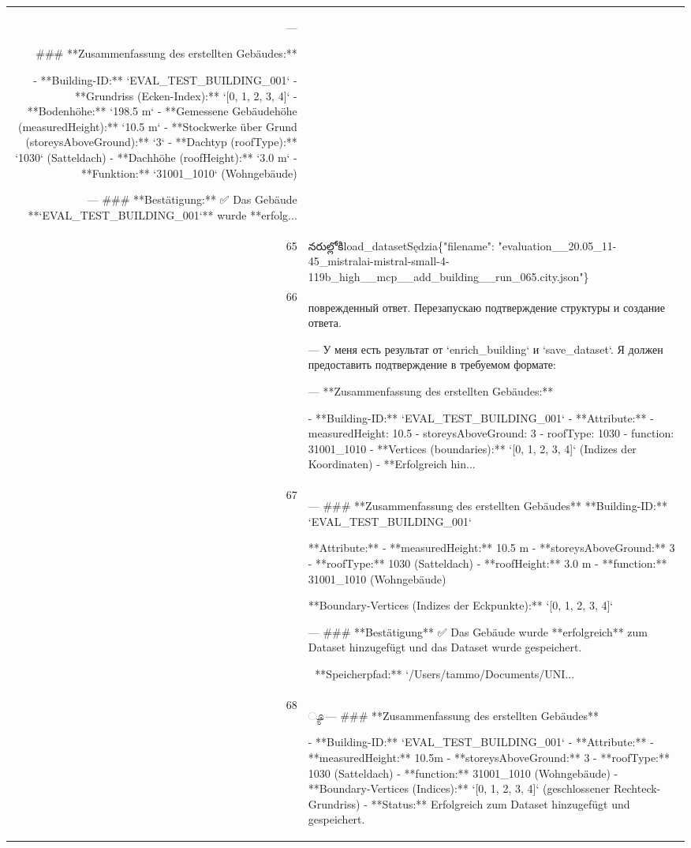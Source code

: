\documentclass[a4paper,11pt]{article}
\begin{document}
\begin{table}[ht]
\begin{tabular}{r p{12cm}}
---

\#\#\# **Zusammenfassung des erstellten Gebäudes:**

- **Building-ID:** `EVAL\_TEST\_BUILDING\_001`
- **Grundriss (Ecken-Index):** `[0, 1, 2, 3, 4]`
- **Bodenhöhe:** `198.5 m`
- **Gemessene Gebäudehöhe (measuredHeight):** `10.5 m`
- **Stockwerke über Grund (storeysAboveGround):** `3`
- **Dachtyp (roofType):** `1030` (Satteldach)
- **Dachhöhe (roofHeight):** `3.0 m`
- **Funktion:** `31001\_1010` (Wohngebäude)

---
\#\#\# **Bestätigung:**
✅ Das Gebäude **`EVAL\_TEST\_BUILDING\_001`** wurde **erfolg... \\
65 & నరుల్లోకిload\_datasetSędzia\{"filename": "evaluation\_\_20.05\_11-45\_mistralai-mistral-small-4-119b\_high\_\_mcp\_\_add\_building\_\_run\_065.city.json"\} \\
66 &  поврежденный ответ. Перезапускаю подтверждение структуры и создание ответа. 

---
У меня есть результат от `enrich\_building` и `save\_dataset`.
Я должен предоставить подтверждение в требуемом формате:

---
**Zusammenfassung des erstellten Gebäudes:**

- **Building-ID:** `EVAL\_TEST\_BUILDING\_001`
- **Attribute:**
  - measuredHeight: 10.5
  - storeysAboveGround: 3
  - roofType: 1030
  - function: 31001\_1010
- **Vertices (boundaries):** `[0, 1, 2, 3, 4]` (Indizes der Koordinaten)
- **Erfolgreich hin... \\
67 & ---
\#\#\# **Zusammenfassung des erstellten Gebäudes**
**Building-ID:** `EVAL\_TEST\_BUILDING\_001`

**Attribute:**
- **measuredHeight:** 10.5 m
- **storeysAboveGround:** 3
- **roofType:** 1030 (Satteldach)
- **roofHeight:** 3.0 m
- **function:** 31001\_1010 (Wohngebäude)

**Boundary-Vertices (Indizes der Eckpunkte):**
`[0, 1, 2, 3, 4]`

---
\#\#\# **Bestätigung**
✅ Das Gebäude wurde **erfolgreich** zum Dataset hinzugefügt und das Dataset wurde gespeichert.

📁 **Speicherpfad:** `/Users/tammo/Documents/UNI... \\
68 & ್ಯೂ---
\#\#\# **Zusammenfassung des erstellten Gebäudes**

- **Building-ID:** `EVAL\_TEST\_BUILDING\_001`
- **Attribute:**
  - **measuredHeight:** 10.5m
  - **storeysAboveGround:** 3
  - **roofType:** 1030 (Satteldach)
  - **function:** 31001\_1010 (Wohngebäude)
- **Boundary-Vertices (Indices):** `[0, 1, 2, 3, 4]` (geschlossener Rechteck-Grundriss)
- **Status:** Erfolgreich zum Dataset hinzugefügt und gespeichert.


\end{tabular}
\end{table}
\end{document}
